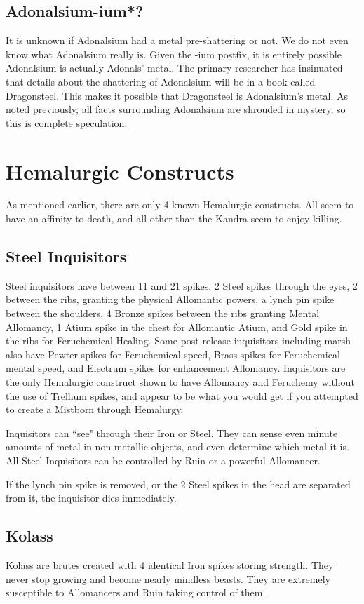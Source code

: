 \documentclass[conference]{IEEEtran}
\begin{document}
\subsection*{Adonalsium-ium*?}
It is unknown if Adonalsium had a metal pre-shattering or not.  We do not even know what Adonalsium really is.  Given the -ium postfix, it is entirely possible Adonalsium is actually Adonals' metal.  The primary researcher has insinuated that details about the shattering of Adonalsium will be in a book called Dragonsteel.  This makes it possible that Dragonsteel is Adonalsium's metal.
As noted previously, all facts surrounding Adonalsium are shrouded in mystery, so this is complete speculation.

\section*{Hemalurgic Constructs}
As mentioned earlier, there are only 4 known Hemalurgic constructs.  All seem to have an affinity to death, and all other than the Kandra seem to enjoy killing.
\subsection*{Steel Inquisitors}
Steel inquisitors have between 11 and 21 spikes.  2 Steel spikes through the eyes, 2 between the ribs, granting the physical Allomantic powers, a lynch pin spike between the shoulders, 4 Bronze spikes between the ribs granting Mental Allomancy, 1 Atium spike in the chest for Allomantic Atium, and Gold spike in the ribs for Feruchemical Healing. Some post release inquisitors including marsh also have Pewter spikes for Feruchemical speed, Brass spikes for Feruchemical mental speed, and Electrum spikes for enhancement Allomancy.  Inquisitors are the only Hemalurgic construct shown to have Allomancy and Feruchemy without the use of Trellium spikes, and appear to be what you would get if you attempted to create a Mistborn through Hemalurgy.

Inquisitors can ``see" through their Iron or Steel.  They can sense even minute amounts of metal in non metallic objects, and even determine which metal it is.
All Steel Inquisitors can be controlled by Ruin or a powerful Allomancer.

If the lynch pin spike is removed, or the 2 Steel spikes in the head are separated from it, the inquisitor dies immediately.
\subsection*{Kolass}
Kolass are brutes created with 4 identical Iron spikes storing strength.  They never stop growing and become nearly mindless beasts.
They are extremely susceptible to Allomancers and Ruin taking control of them.  \\
\end{document}
